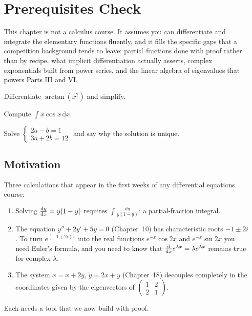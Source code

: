 \chapter{Prerequisites Check}\label{ch:ch00}

This chapter is not a calculus course. It assumes you can differentiate and
integrate the elementary functions fluently, and it fills the specific gaps
that a competition background tends to leave: partial fractions done with
proof rather than by recipe, what implicit differentiation actually asserts,
complex exponentials built from power series, and the linear algebra of
eigenvalues that powers Parts III and VI.


\begin{diagnostic}
  \item Differentiate $\arctan(x^2)$ and simplify.
  \item Compute $\displaystyle\int x\cos x\,\mathrm{d}x$.
  \item Solve $\begin{cases}2a - b = 1\\ 3a + 2b = 12\end{cases}$ and say why the
        solution is unique.
\end{diagnostic}

\section{Motivation}\label{sec:ch00-motivation}

Three calculations that appear in the first weeks of any differential
equations course:
\begin{enumerate}[label=(\alph*)]
  \item Solving $\frac{\mathrm{d}y}{\mathrm{d}x} = y(1-y)$ requires
        $\displaystyle\int\frac{\mathrm{d}y}{y(1-y)}$: a partial-fraction
        integral.
  \item The equation $y'' + 2y' + 5y = 0$ (Chapter~10) has characteristic
        roots $-1\pm 2i$. To turn $e^{(-1+2i)x}$ into the real functions
        $e^{-x}\cos 2x$ and $e^{-x}\sin 2x$ you need Euler's formula, and you
        need to know that $\frac{\mathrm{d}}{\mathrm{d}x}e^{\lambda x} = \lambda e^{\lambda x}$
        remains true for complex $\lambda$.
  \item The system $\dot{x} = x + 2y$, $\dot{y} = 2x + y$ (Chapter~18)
        decouples completely in the coordinates given by the eigenvectors of
        $\left(\begin{smallmatrix}1&2\\2&1\end{smallmatrix}\right)$.
\end{enumerate}
Each needs a tool that we now build with proof.

